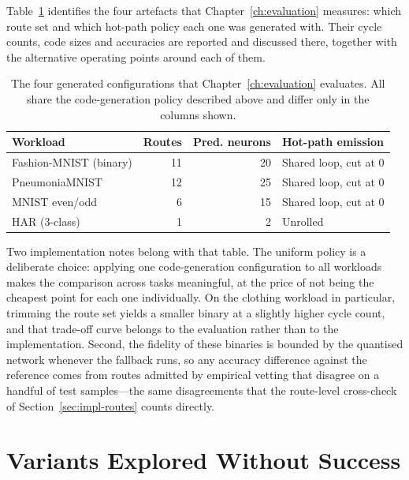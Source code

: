 Table~\ref{tab:impl-final} identifies the four artefacts that Chapter~\ref{ch:evaluation} measures: which route set and which hot-path policy each one was generated with.
Their cycle counts, code sizes and accuracies are reported and discussed there, together with the alternative operating points around each of them.

\begin{table}[H]
	\centering
	\small
	\caption{The four generated configurations that Chapter~\ref{ch:evaluation} evaluates.
		All share the code-generation policy described above and differ only in the columns shown.}
	\label{tab:impl-final}
	\begin{tabularx}{\textwidth}{@{}>{\raggedright\arraybackslash}p{}rr>{\raggedright\arraybackslash}X@{}}
		\toprule
		\textbf{Workload} & \textbf{Routes} & \textbf{Pred. neurons} & \textbf{Hot-path emission} \\
		\midrule
		Fashion-MNIST (binary) & 11 & 20 & Shared loop, cut at 0 \\
		PneumoniaMNIST & 12 & 25 & Shared loop, cut at 0 \\
		MNIST even/odd & 6 & 15 & Shared loop, cut at 0 \\
		HAR (3-class) & 1 & 2 & Unrolled \\
		\bottomrule
	\end{tabularx}
\end{table}

Two implementation notes belong with that table.
The uniform policy is a deliberate choice: applying one code-generation configuration to all workloads makes the comparison across tasks meaningful, at the price of not being the cheapest point for each one individually.
On the clothing workload in particular, trimming the route set yields a smaller binary at a slightly higher cycle count, and that trade-off curve belongs to the evaluation rather than to the implementation.
Second, the fidelity of these binaries is bounded by the quantised network whenever the fallback runs, so any accuracy difference against the reference comes from routes admitted by empirical vetting that disagree on a handful of test samples---the same disagreements that the route-level cross-check of Section~\ref{sec:impl-routes} counts directly.


\section{Variants Explored Without Success}
\label{sec:impl-negative}

